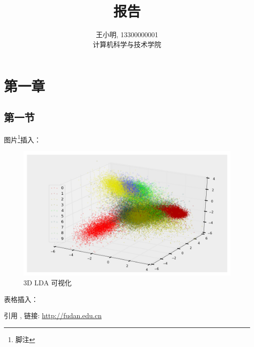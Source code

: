 \documentclass[11pt, oneside]{ctexart}
\begin{document}
\title{报告}
\author{王小明, 13300000001 \\ 计算机科学与技术学院}
\maketitle
\section{第一章}
\subsection{第一节}

图片\footnote{脚注}插入：

\begin{figure}[!htbp]
\centering
\includegraphics[width=0.9\linewidth]{fig/3d_lda.png}
   \caption{3D LDA 可视化}
\label{fig:3d_lda}
\end{figure}


表格插入：

\begin{table}[!htbp]
  \centering
\caption{错误}
\label{tb:lda_knn}
\end{table}

引用 \cite{bishop2006pattern}, 链接: \url{http://fudan.edu.cn}



\end{document}
